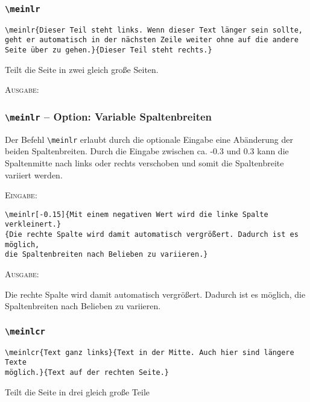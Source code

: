 \documentclass[a4paper,12pt]{article}
\begin{document}
\leer

\subsubsection{\texttt{\textbackslash meinlr}}
\begin{verbatim}
\meinlr{Dieser Teil steht links. Wenn dieser Text länger sein sollte, 
geht er automatisch in der nächsten Zeile weiter ohne auf die andere 
Seite über zu gehen.}{Dieser Teil steht rechts.}
\end{verbatim}
Teilt die Seite in zwei gleich große Seiten. 

\leer

\textsc{Ausgabe:}



\subsubsection*{\texttt{\textbackslash meinlr} -- Option: Variable Spaltenbreiten}

Der Befehl \texttt{\textbackslash meinlr} erlaubt durch die optionale Eingabe eine Abänderung der beiden Spaltenbreiten. Durch die Eingabe zwischen ca. -0.3 und 0.3 kann die Spaltenmitte nach links oder rechts verschoben und somit die Spaltenbreite variiert werden.

\textsc{Eingabe:}

\begin{verbatim}
\meinlr[-0.15]{Mit einem negativen Wert wird die linke Spalte verkleinert.}
{Die rechte Spalte wird damit automatisch vergrößert. Dadurch ist es möglich, 
die Spaltenbreiten nach Belieben zu variieren.}
\end{verbatim}

\textsc{Ausgabe:}

{Die rechte Spalte wird damit automatisch vergrößert. Dadurch ist es möglich, 
die Spaltenbreiten nach Belieben zu variieren.}

\leer

\subsubsection{\texttt{\textbackslash meinlcr}}
\begin{verbatim}
\meinlcr{Text ganz links}{Text in der Mitte. Auch hier sind längere Texte
möglich.}{Text auf der rechten Seite.}
\end{verbatim}
Teilt die Seite in drei gleich große Teile
\end{document}

